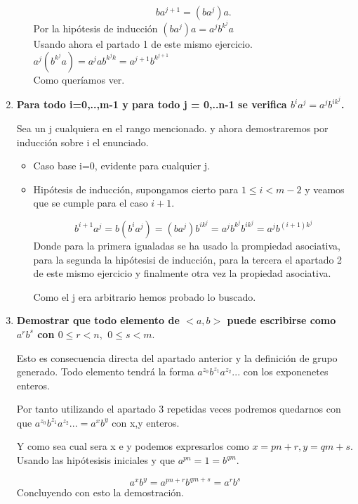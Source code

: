 \documentclass[12pt]{article}
\begin{document}
\begin{enumerate}
\begin{itemize}
        $$b a^{j+1} = (b  a ^j ) a.$$ 
        Por la hipótesis de inducción $(b  a ^j ) a = a^j b^{k ^j} a$  \\
        Usando ahora el partado 1 de este mismo ejercicio. \\
        $a^j (b^{k ^j} a) = a^j a b^{k^j k } =  a^{j+1}b^{k^{j+1}}$  \\

        Como queríamos ver. 
        
    \end{itemize}  


    \item \textbf{Para todo i=0,..,m-1 y para todo j = 0,..n-1 se verifica $b^ia^j = a^j b^{i k ^j}$.}
    
    Sea un j cualquiera en el rango mencionado. 
    y ahora demostraremos por inducción sobre i el enunciado.

    \begin{itemize}
        \item Caso base i=0, evidente para cualquier j. 
        \item Hipótesis de inducción, supongamos cierto para  $1\leq i < m-2$ y veamos que se cumple para el caso $i+1$. 
        
        $$b^{i+1} a^{j} =  b (b^i a^j) = (b a^j) b^{i k^j} = a^j b^{k^j} b^{i k^j} = a^j b^{(i+1) k^j}$$
        Donde para la primera igualadas se ha usado la prompiedad asociativa, para la segunda la hipótesisi de inducción, para la tercera el apartado 2 
        de este mismo ejercicio y finalmente otra vez la propiedad asociativa. 

        Como el j era arbitrario hemos probado lo buscado. 
    \end{itemize}


    \item \textbf{Demostrar que todo elemento de $<a,b>$ puede escribirse como $a^rb^s$ con $0 \leq r <n,$ $0 \leq s <m.$}
    
    Esto es consecuencia directa del apartado anterior y la definición de grupo generado.
    Todo elemento tendrá la forma $a^{z_0} b^{z_1}a^{z_2}...$ con 
    los exponenetes enteros. 
    
    Por tanto utilizando el apartado 3 repetidas veces podremos quedarnos con que  $a^{z_0} b^{z_1}a^{z_2}... = a^x b^y$ con x,y enteros. 

    Y como sea cual sera x e y podemos expresarlos como $x = pn + r, y = qm +s.$
    Usando las hipótesisis iniciales  y que $a^{pn} = 1 = b^{qm}.$

    $$a^x b^y = a^{pn + r} b^{qm + s} = a^r b^s$$
Concluyendo con esto la demostración. 
    
    

\end{enumerate}
\newpage
\end{document}
